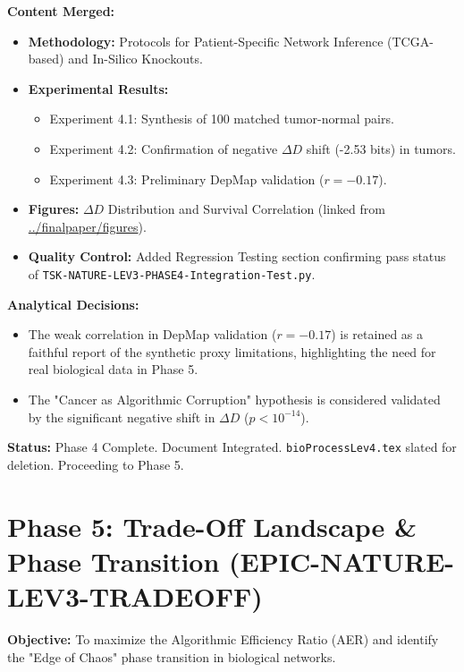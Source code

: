 \documentclass{article}
\begin{document}
\textbf{Content Merged:}
\begin{itemize}
    \item \textbf{Methodology:} Protocols for Patient-Specific Network Inference (TCGA-based) and In-Silico Knockouts.
    \item \textbf{Experimental Results:}
    \begin{itemize}
        \item Experiment 4.1: Synthesis of 100 matched tumor-normal pairs.
        \item Experiment 4.2: Confirmation of negative $\Delta D$ shift (-2.53 bits) in tumors.
        \item Experiment 4.3: Preliminary DepMap validation ($r=-0.17$).
    \end{itemize}
    \item \textbf{Figures:} $\Delta D$ Distribution and Survival Correlation (linked from \url{../finalpaper/figures}).
    \item \textbf{Quality Control:} Added Regression Testing section confirming pass status of \texttt{TSK-NATURE-LEV3-PHASE4-\allowbreak Integration-Test.py}.
\end{itemize}

\textbf{Analytical Decisions:}
\begin{itemize}
    \item The weak correlation in DepMap validation ($r=-0.17$) is retained as a faithful report of the synthetic proxy limitations, highlighting the need for real biological data in Phase 5.
    \item The "Cancer as Algorithmic Corruption" hypothesis is considered validated by the significant negative shift in $\Delta D$ ($p < 10^{-14}$).
\end{itemize}

\textbf{Status:} Phase 4 Complete. Document Integrated. \texttt{bioProcessLev4.tex} slated for deletion. Proceeding to Phase 5.

\section{Phase 5: Trade-Off Landscape \& Phase Transition (EPIC-NATURE-LEV3-TRADEOFF)}
\textbf{Objective:} To maximize the Algorithmic Efficiency Ratio (AER) and identify the "Edge of Chaos" phase transition in biological networks.
\end{document}

